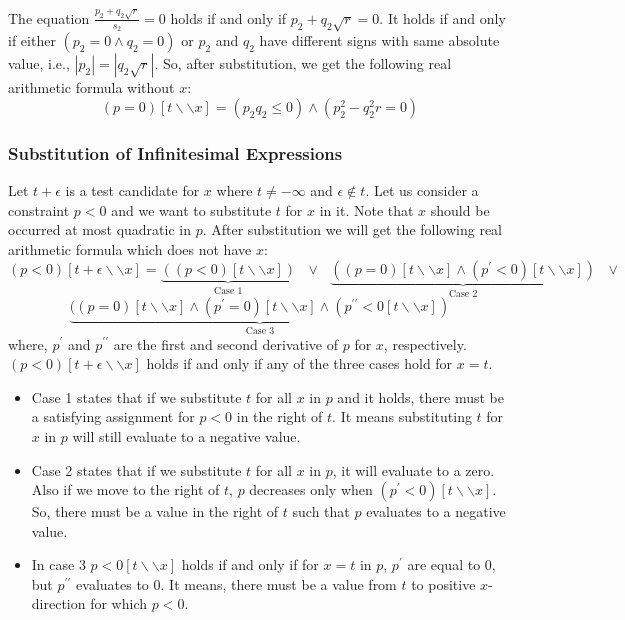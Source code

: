 The equation $\frac{p_{2}+q_{2}\sqrt{r}}{s_{2}} = 0$ holds if and only if $p_{2}+q_{2}\sqrt{r} = 0$. It holds if and only if either $(p_{2} = 0\wedge q_{2} = 0)$ or $p_{2}$ and $q_{2}$ have different signs with same absolute value, i.e., $|p_{2}|=|q_{2}\sqrt{r}|$. So, after substitution, we get the following real arithmetic formula without $x$:
$$ (p = 0)[t\backslash\backslash x] = (p_{2}q_{2}\leq 0) \wedge (p_{2}^{2} - q_{2}^{2} r = 0) $$
\subsubsection{Substitution of Infinitesimal Expressions}
Let $t+\epsilon$ is a test candidate for $x$ where $t\neq - \infty$ and $\epsilon \notin t$. Let us consider a constraint $p<0$ and we want to substitute $t$ for $x$ in it. Note that $x$ should be occurred at most quadratic in $p$. After substitution we will get the following real arithmetic formula which does not have $x$:
$$(p<0)[t+\epsilon\backslash\backslash x]=\underbrace{((p<0)[t\backslash\backslash x])}\limits_{\text{Case 1}} \text{ }\vee\text{ }\underbrace{((p=0)[t\backslash\backslash x]\wedge(p^{\prime}<0)[t\backslash\backslash x])}\limits_{\text{Case 2}}\text{ }\vee$$
$$\underbrace{((p=0)[t\backslash\backslash x]\wedge(p^{\prime}=0)[t\backslash\backslash x]\wedge (p^{\prime\prime}<0[t\backslash\backslash x])}\limits_{\text{Case 3}} $$
where, $p^{\prime}$ and $p^{\prime\prime}$ are the first and second derivative of $p$ for $x$, respectively. $(p<0)[t+\epsilon\backslash\backslash x]$ holds if and only if any of the three cases hold for $x=t$.
\begin{itemize}
	\item Case 1 states that if we substitute $t$ for all $x$ in $p$ and it holds, there must be a satisfying assignment for $p<0$ in the right of $t$. It means substituting $t$ for $x$ in $p$ will still evaluate to a negative value.
	\item Case 2 states that if we substitute $t$ for all $x$ in $p$, it will evaluate to a zero. Also if we move to the right of $t$, $p$ decreases only when $(p^{\prime}<0)[t\backslash\backslash x]$. So, there must be a value in the right of $t$ such that $p$ evaluates to a negative value.
	\item In case 3 $p<0[t\backslash\backslash x]$ holds if and only if for $x = t$ in $p$, $p^{\prime}$ are equal to $0$, but $p^{\prime\prime}$ evaluates to $0$. It means, there must be a value from $t$ to positive $x$-direction for which $p<0$.
\end{itemize}
